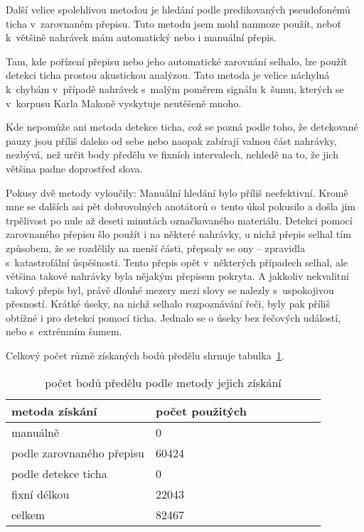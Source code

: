 Další velice spolehlivou metodou je hledání podle predikovaných pseudofonémů
ticha v~zarovnaném přepisu. Tuto metodu jsem mohl namnoze použít, neboť
k~většině nahrávek mám automatický nebo i manuální přepis.

Tam, kde pořízení přepisu nebo jeho automatické zarovnání selhalo, lze použít
detekci ticha prostou akustickou analýzou. Tato metoda je velice náchylná
k~chybám v~případě nahrávek s~malým poměrem signálu k~šumu, kterých se v~korpusu
Karla Makoně vyskytuje neutěšeně mnoho.

Kde nepomůže ani metoda detekce ticha, což se pozná podle toho, že detekované
pauzy jsou příliš daleko od sebe nebo naopak zabírají valnou část nahrávky,
nezbývá, než určit body předělu ve fixních intervalech, nehledě na to, že jich
většina padne doprostřed slova.

Pokusy dvě metody vyloučily: Manuální hledání bylo příliš neefektivní. Kromě mne
se dalších asi pět dobrovolných anotátorů o~tento úkol pokusilo a došla jim
trpělivost po nule až deseti minutách označkovaného materiálu. Detekci pomocí
zarovnaného přepisu šlo použít i na některé nahrávky, u nichž přepis selhal tím
způsobem, že se rozdělily na menší části, přepsaly se ony -- zpravidla
s~katastrofální úspěšnosti. Tento přepis opět v~některých případech selhal, ale
většina takové nahrávky byla nějakým přepisem pokryta. A jakkoliv nekvalitní
takový přepis byl, právě dlouhé mezery mezi slovy se nalezly s~uspokojivou
přesností. Krátké úseky, na nichž selhalo rozpoznávání řeči, byly pak příliš
obtížné i pro detekci pomocí ticha. Jednalo se o úseky bez řečových událostí,
nebo s~extrémním šumem.


Celkový počet různě získaných bodů předělu shrnuje
tabulka~\ref{tab:splitpoints}.

\begin{table}[htpb]
\begin{center}
\begin{tabular}{|l|l|l|l||l|l|l|l|}
\hline
metoda získání & počet použitých \\
\hline
manuálně & 0 \\
podle zarovnaného přepisu & 60424 \\
podle detekce ticha & 0 \\
fixní délkou & 22043 \\
celkem & 82467 \\
\hline
\end{tabular}
\caption{počet bodů předělu podle metody jejich získání}\label{tab:splitpoints}
\end{center}
\end{table}

